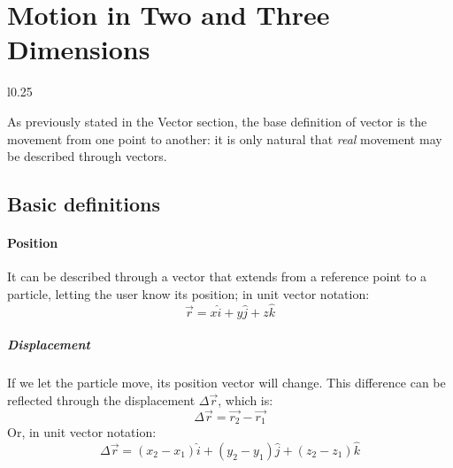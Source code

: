 \section{Motion in Two and Three Dimensions}
\begin{wrapfigure}{l}{0.25\textwidth}

\end{wrapfigure}
As previously stated in the Vector section, the base definition of vector is the movement from one point to another: it is only natural that \emph{real} movement may be described through vectors.
\subsection{Basic definitions}
\paragraph{Position} It can be described through a vector that extends from a reference point to a particle, letting the user know its position; in unit vector notation:
\begin{equation}
\vec{r} = x\hat{i}+y\hat{j}+z\hat{k}
\end{equation}
\subparagraph{Displacement} If we let the particle move, its position vector will change. This difference can be reflected through the displacement $\Delta\vec{r}$, which is:
\begin{equation}
\Delta\vec{r}= \vec{r_2} - \vec{r_1}
\end{equation}
Or, in unit vector notation:
\begin{equation}
\Delta\vec{r} = (x_2 - x_1) \hat{i} + (y_2 - y_1) \hat{j} + (z_2 - z_1) \hat{k}
\end{equation}
